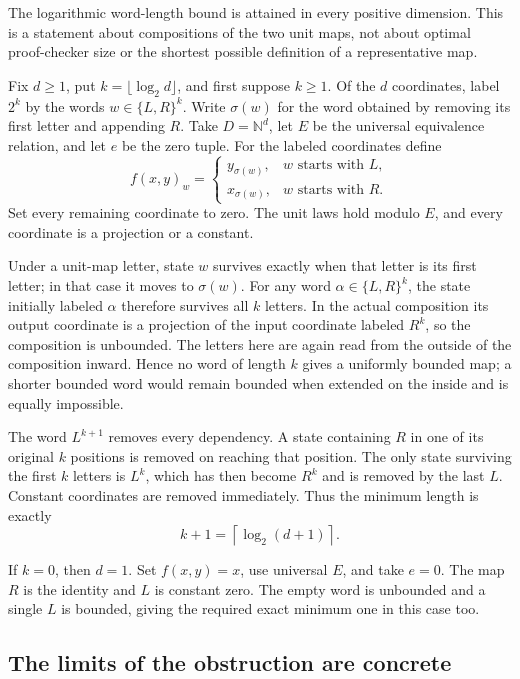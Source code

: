 The logarithmic word-length bound is attained in every positive
dimension. This is a statement about compositions of the two unit
maps, not about optimal proof-checker size or the shortest possible
definition of a representative map.

Fix $d\geq1$, put $k=\lfloor\log_2d\rfloor$, and first suppose
$k\geq1$. Of the $d$ coordinates, label $2^k$ by the words
$w\in\{L,R\}^k$. Write $\sigma(w)$ for the word obtained by removing
its first letter and appending $R$. Take $D=\mathbb N^d$, let $E$
be the universal equivalence relation, and let $e$ be the zero tuple.
For the labeled coordinates define
\[
 f(x,y)_w=
 \begin{cases}
 y_{\sigma(w)},&w\text{ starts with }L,\\
 x_{\sigma(w)},&w\text{ starts with }R.
 \end{cases}
\]
Set every remaining coordinate to zero. The unit laws hold modulo
$E$, and every coordinate is a projection or a constant.

Under a unit-map letter, state $w$ survives exactly when that letter
is its first letter; in that case it moves to $\sigma(w)$. For any
word $\alpha\in\{L,R\}^k$, the state initially labeled $\alpha$
therefore survives all $k$ letters. In the actual composition its
output coordinate is a projection of the input coordinate labeled
$R^k$, so the composition is unbounded. The letters here are again
read from the outside of the composition inward. Hence no word of
length $k$ gives a uniformly bounded map; a shorter bounded word
would remain bounded when extended on the inside and is equally
impossible.

The word $L^{k+1}$ removes every dependency. A state containing $R$
in one of its original $k$ positions is removed on reaching that
position. The only state surviving the first $k$ letters is $L^k$,
which has then become $R^k$ and is removed by the last $L$.
Constant coordinates are removed immediately. Thus the minimum
length is exactly
\[
                 k+1=\left\lceil\log_2(d+1)\right\rceil.
\]

If $k=0$, then $d=1$. Set $f(x,y)=x$, use universal $E$, and take
$e=0$. The map $R$ is the identity and $L$ is constant zero. The
empty word is unbounded and a single $L$ is bounded, giving the
required exact minimum one in this case too.

\subsection{The limits of the obstruction are concrete}

